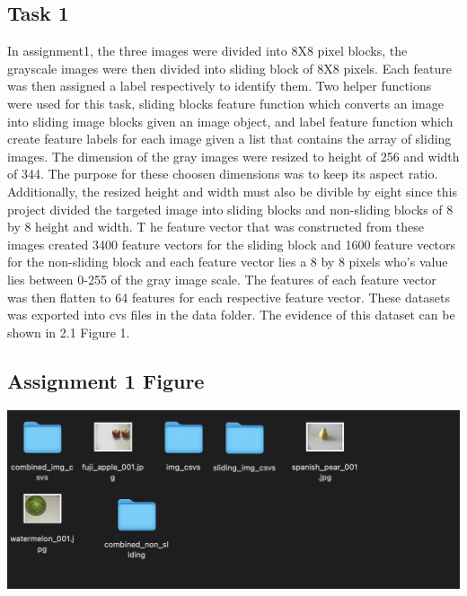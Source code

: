 \documentclass[12pt]{article}
\begin{document}
\begin{multicols*}{2}
  \section{Task 1}
  \hspace*{5mm} In assignment1, the three images were divided into 8X8 pixel blocks, the grayscale images were then divided into sliding block of 8X8 pixels. Each feature was then assigned a label respectively to identify them. 
  Two helper functions were used for this task, sliding blocks feature function which converts an image into sliding image blocks given an image object, and 
  label feature function which create feature labels for each image given a list that contains the array of sliding images. The dimension of the gray images were resized to height of 256 and width of 344. The purpose for these choosen dimensions was to keep its aspect ratio. 
  Additionally, the resized height and width must also be divible by eight since this project divided the targeted image into sliding blocks and non-sliding blocks of 8 by 8 height and width. T
  he feature vector that was constructed from these images created 3400 feature vectors for the sliding block and 1600 feature vectors for the non-sliding block and each feature vector lies a 8 by 8 pixels who’s value lies between 0-255 of the gray image scale. 
  The features of each feature vector was then flatten to 64 features for each respective feature vector. These datasets was exported into cvs files in the data folder.
  The evidence of this dataset can be shown in 2.1 Figure 1. 

  \subsection{Assignment 1 Figure} 
	\begin{center}
		\includegraphics[scale=0.2]{../screenshot/csvs.png}	
    \end{center}



\end{multicols*}
\end{document}
